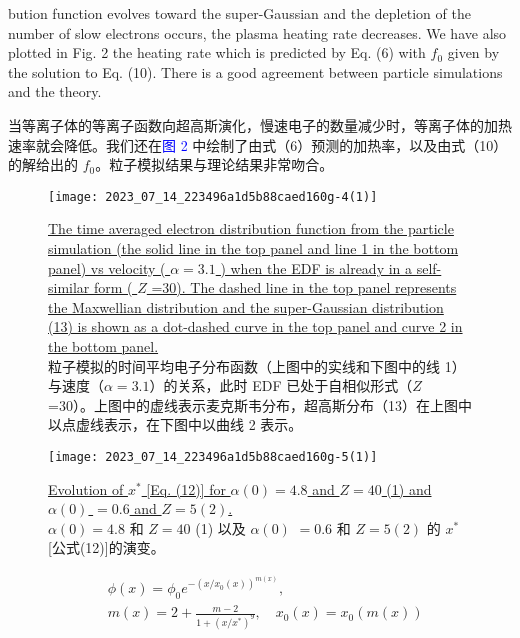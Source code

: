 \documentclass[oneside,onecolumn]{article}
\newcommand\enzhbox[2]{
  	\quad\par \begin{paracol}{2} \colseprulecolor{black} 
  			\begin{spacing}{1.0}
  				\footnotesize  #1
  			\end{spacing}
  		\switchcolumn[1] 
  		#2
  	\end{paracol} 
  }
\begin{document}
\begin{sloppypar}
 
\enzhbox{   bution function evolves toward the super-Gaussian and the depletion of the number of slow electrons occurs, the plasma heating rate decreases. We have also plotted in Fig. 2 the heating rate which is predicted by Eq. (6) with $f_{0}$ given by the solution to Eq. (10). There is a good agreement between particle simulations and the theory.
}{
当等离子体的等离子函数向超高斯演化，慢速电子的数量减少时，等离子体的加热速率就会降低。我们还在\textcolor{blue}{图 2} 中绘制了由式（6）预测的加热率，以及由式（10）的解给出的 $f_{0}$。粒子模拟结果与理论结果非常吻合。

}
  
  \begin{figure}[tbp]
  	\centering
  	\texttt{[image: 2023\_07\_14\_223496a1d5b88caed160g-4(1)]}
  	\caption{\uline{The time averaged electron distribution function from the particle simulation (the solid line in the top panel and line 1 in the bottom panel) vs velocity ( $\alpha=3.1$ ) when the EDF is already in a self-similar form ( $Z$ =30). The dashed line in the top panel represents the Maxwellian distribution and the super-Gaussian distribution (13) is shown as a dot-dashed curve in the top panel and curve 2 in the bottom panel.}\\粒子模拟的时间平均电子分布函数（上图中的实线和下图中的线 1）与速度（$\alpha=3.1$）的关系，此时 EDF 已处于自相似形式（$Z$ =30）。上图中的虚线表示麦克斯韦分布，超高斯分布（13）在上图中以点虚线表示，在下图中以曲线 2 表示。}
  	\label{fig3.}
  \end{figure}
  
  \begin{figure}[tbp]
  	\centering
  	\texttt{[image: 2023\_07\_14\_223496a1d5b88caed160g-5(1)]}
  	\caption{\uline{Evolution of $x^{*}$ [Eq. (12)] for $\alpha(0)=4.8$ and $Z=40$ (1) and $\alpha(0)$ $=0.6$ and $Z=5(2)$.}\\$\alpha(0)=4.8$ 和 $Z=40$ (1) 以及 $\alpha(0)$ $=0.6$ 和 $Z=5(2)$ 的 $x^{*}$ [公式(12)]的演变。}
  	\label{fig4.}
  \end{figure}
  
  \begin{dmath}[compact]
  \begin{aligned}
  & \phi(x)=\phi_{0} e^{-\left(x / x_{0}(x)\right)^{m(x)}}, \\
  & m(x)=2+\frac{m-2}{1+\left(x / x^{*}\right)^{9}}, \quad x_{0}(x)=x_{0}(m(x))
  \end{aligned}
  \end{dmath}
  

\end{sloppypar}
\end{document}
